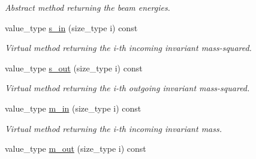 \begin{DoxyCompactItemize}
\begin{DoxyCompactList}\small\item\em Abstract method returning the beam energies. \end{DoxyCompactList}\item 
\hypertarget{a00529_a71d752a5acef264885ab6264fb98d18f}{value\-\_\-type \hyperlink{a00529_a71d752a5acef264885ab6264fb98d18f}{s\-\_\-in} (size\-\_\-type i) const }\label{a00529_a71d752a5acef264885ab6264fb98d18f}

\begin{DoxyCompactList}\small\item\em Virtual method returning the i-\/th incoming invariant mass-\/squared. \end{DoxyCompactList}\item 
\hypertarget{a00529_af3cd0ccd868f83080ba0569511acff5b}{value\-\_\-type \hyperlink{a00529_af3cd0ccd868f83080ba0569511acff5b}{s\-\_\-out} (size\-\_\-type i) const }\label{a00529_af3cd0ccd868f83080ba0569511acff5b}

\begin{DoxyCompactList}\small\item\em Virtual method returning the i-\/th outgoing invariant mass-\/squared. \end{DoxyCompactList}\item 
\hypertarget{a00529_a6dab2ba04d5b791e5cf22c988f046ade}{value\-\_\-type \hyperlink{a00529_a6dab2ba04d5b791e5cf22c988f046ade}{m\-\_\-in} (size\-\_\-type i) const }\label{a00529_a6dab2ba04d5b791e5cf22c988f046ade}

\begin{DoxyCompactList}\small\item\em Virtual method returning the i-\/th incoming invariant mass. \end{DoxyCompactList}\item 
\hypertarget{a00529_a4d195f3f1c1f7ca1558167ccc0270f10}{value\-\_\-type \hyperlink{a00529_a4d195f3f1c1f7ca1558167ccc0270f10}{m\-\_\-out} (size\-\_\-type i) const }\label{a00529_a4d195f3f1c1f7ca1558167ccc0270f10}


\end{DoxyCompactItemize}
